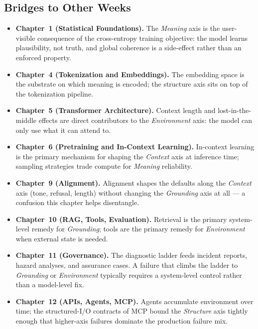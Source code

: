 \subsection{Bridges to Other Weeks}

\begin{itemize}
  \item \textbf{Chapter~1 (Statistical Foundations).} The
        \emph{Meaning} axis is the user-visible consequence of the
        cross-entropy training objective: the model learns
        plausibility, not truth, and global coherence is a
        side-effect rather than an enforced property.
  \item \textbf{Chapter~4 (Tokenization and Embeddings).} The
        embedding space is the substrate on which meaning is
        encoded; the structure axis sits on top of the
        tokenization pipeline.
  \item \textbf{Chapter~5 (Transformer Architecture).} Context
        length and lost-in-the-middle effects are direct
        contributors to the \emph{Environment} axis: the model can
        only use what it can attend to.
  \item \textbf{Chapter~6 (Pretraining and In-Context Learning).}
        In-context learning is the primary mechanism for shaping
        the \emph{Context} axis at inference time; sampling
        strategies trade compute for \emph{Meaning} reliability.
  \item \textbf{Chapter~9 (Alignment).} Alignment shapes the
        defaults along the \emph{Context} axis (tone, refusal,
        length) without changing the \emph{Grounding} axis at all
        --- a confusion this chapter helps disentangle.
  \item \textbf{Chapter~10 (RAG, Tools, Evaluation).} Retrieval is
        the primary system-level remedy for \emph{Grounding};
        tools are the primary remedy for \emph{Environment} when
        external state is needed.
  \item \textbf{Chapter~11 (Governance).} The diagnostic ladder
        feeds incident reports, hazard analyses, and assurance
        cases. A failure that climbs the ladder to
        \emph{Grounding} or \emph{Environment} typically requires
        a system-level control rather than a model-level fix.
  \item \textbf{Chapter~12 (APIs, Agents, MCP).} Agents accumulate
        environment over time; the structured-I/O contracts of
        MCP bound the \emph{Structure} axis tightly enough that
        higher-axis failures dominate the production failure mix.
\end{itemize}


